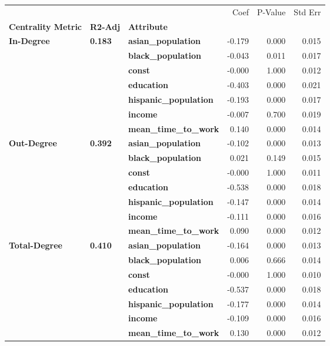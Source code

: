 \begin{tabular}{lllrrr}
\toprule
             &       &                   &   Coef &  P-Value &  Std Err \\
\textbf{Centrality Metric} & \textbf{R2-Adj} & \textbf{Attribute} &        &          &          \\
\midrule
\multirow{7}{*}{\textbf{In-Degree}} & \multirow{7}{*}{\textbf{0.183}} & \textbf{asian\_population} & -0.179 &    0.000 &    0.015 \\
             &       & \textbf{black\_population} & -0.043 &    0.011 &    0.017 \\
             &       & \textbf{const} & -0.000 &    1.000 &    0.012 \\
             &       & \textbf{education} & -0.403 &    0.000 &    0.021 \\
             &       & \textbf{hispanic\_population} & -0.193 &    0.000 &    0.017 \\
             &       & \textbf{income} & -0.007 &    0.700 &    0.019 \\
             &       & \textbf{mean\_time\_to\_work} &  0.140 &    0.000 &    0.014 \\
\cline{1-6}
\cline{2-6}
\multirow{7}{*}{\textbf{Out-Degree}} & \multirow{7}{*}{\textbf{0.392}} & \textbf{asian\_population} & -0.102 &    0.000 &    0.013 \\
             &       & \textbf{black\_population} &  0.021 &    0.149 &    0.015 \\
             &       & \textbf{const} & -0.000 &    1.000 &    0.011 \\
             &       & \textbf{education} & -0.538 &    0.000 &    0.018 \\
             &       & \textbf{hispanic\_population} & -0.147 &    0.000 &    0.014 \\
             &       & \textbf{income} & -0.111 &    0.000 &    0.016 \\
             &       & \textbf{mean\_time\_to\_work} &  0.090 &    0.000 &    0.012 \\
\cline{1-6}
\cline{2-6}
\multirow{7}{*}{\textbf{Total-Degree}} & \multirow{7}{*}{\textbf{0.410}} & \textbf{asian\_population} & -0.164 &    0.000 &    0.013 \\
             &       & \textbf{black\_population} &  0.006 &    0.666 &    0.014 \\
             &       & \textbf{const} & -0.000 &    1.000 &    0.010 \\
             &       & \textbf{education} & -0.537 &    0.000 &    0.018 \\
             &       & \textbf{hispanic\_population} & -0.177 &    0.000 &    0.014 \\
             &       & \textbf{income} & -0.109 &    0.000 &    0.016 \\
             &       & \textbf{mean\_time\_to\_work} &  0.130 &    0.000 &    0.012 \\
\bottomrule
\end{tabular}
